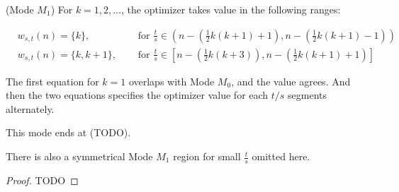 \documentclass[]{article}
\begin{document}
\hspace{1cm}
\begin{lemma} 
	(Mode $M_1$) For $k = 1,2,\dots$, the optimizer takes value in the following ranges:
	
	\begin{align*}
	&w_{s,t}(n) = \{k\},\quad &\text{ for } \frac{t}{s} \in \left(n - \left(\frac{1}{2}k(k+1) + 1\right), n - \left(\frac{1}{2}k(k+1) - 1\right)\right)\\
	&w_{s,t}(n) = \{k, k + 1\},\quad &\text{ for } \frac{t}{s} \in \left[ n - \left(\frac{1}{2}k(k+3)\right), n - \left(\frac{1}{2}k(k+1) + 1\right) \right]
	\end{align*}
	
	The first equation for $k=1$ overlaps with Mode $M_0$, and the value agrees. And then the two equations specifies the optimizer value for each $t/s$ segments alternately.

	This mode ends at (TODO).
	
	There is also a symmetrical Mode $M_1$ region for small $\frac{t}{s}$ omitted here.
	
\end{lemma}
\begin{proof}
	TODO
\end{proof}
\end{document}
